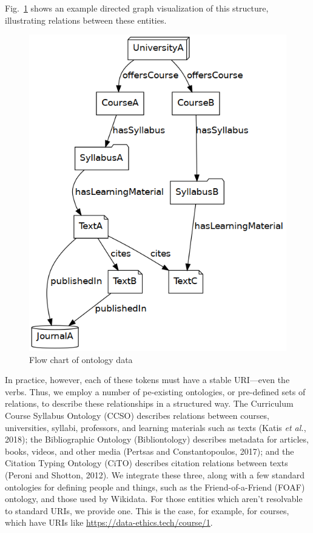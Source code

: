 \documentclass[
]{article}
\begin{document}
Fig.~\ref{fig:chart} shows an example directed graph visualization of
this structure, illustrating relations between these entities.

\begin{figure}
\hypertarget{fig:chart}{%
\centering
\includegraphics{chart.png}
\caption{Flow chart of ontology data}\label{fig:chart}
}
\end{figure}

In practice, however, each of these tokens must have a stable URI---even
the verbs. Thus, we employ a number of pe-existing ontologies, or
pre-defined sets of relations, to describe these relationships in a
structured way. The Curriculum Course Syllabus Ontology (CCSO) describes
relations between courses, universities, syllabi, professors, and
learning materials such as texts (Katis \emph{et al.}, 2018); the
Bibliographic Ontology (Bibliontology) describes metadata for articles,
books, videos, and other media (Pertsas and Constantopoulos, 2017); and
the Citation Typing Ontology (CiTO) describes citation relations between
texts (Peroni and Shotton, 2012). We integrate these three, along with a
few standard ontologies for defining people and things, such as the
Friend-of-a-Friend (FOAF) ontology, and those used by Wikidata. For
those entities which aren't resolvable to standard URIs, we provide one.
This is the case, for example, for courses, which have URIs like
\url{https://data-ethics.tech/course/1}.
\end{document}
